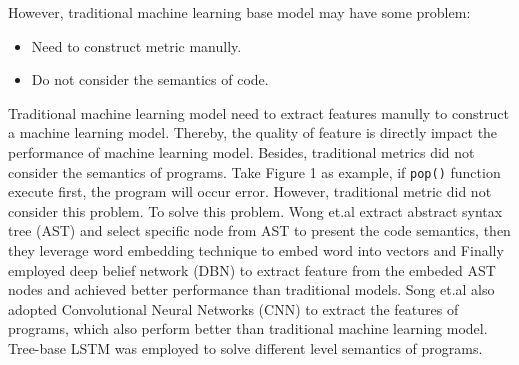 \documentclass{article}
\begin{document}
However, traditional machine learning base model may have some problem:
\begin{itemize}
    \item Need to construct metric manully.
    \item Do not consider the semantics of code.
\end{itemize}
Traditional machine learning model need to extract features manully to construct a machine learning model. Thereby, the quality of feature is directly impact the performance of machine learning model. Besides, traditional metrics did not consider the semantics of programs. Take Figure 1 as example, if \texttt{pop()} function execute first, the program will occur error. However, traditional metric did not consider this problem. To solve this problem. Wong et.al \cite{} extract abstract syntax tree (AST) and select specific node from AST to present the code semantics, then they leverage word embedding technique to embed word into vectors and Finally employed deep belief network (DBN) \cite{} to extract feature from the embeded AST nodes and achieved better performance than traditional models. Song et.al also adopted Convolutional Neural Networks (CNN) to extract the features of programs, which also perform better than traditional machine learning model. Tree-base LSTM was employed to solve different level semantics of programs.\\
\end{document}
